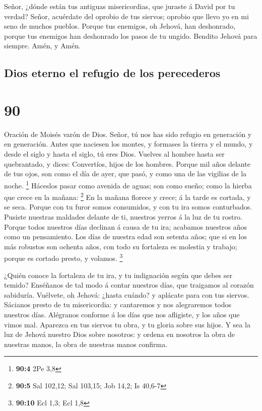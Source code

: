  Señor, ¿dónde están tus antiguas misericordias, que
juraste á David por tu verdad?  Señor, acuérdate del
oprobio de tus siervos; oprobio que llevo yo en mi seno de muchos
pueblos.  Porque tus enemigos, oh Jehová, han deshonrado,
porque tus enemigos han deshonrado los pasos de tu ungido. 
Bendito Jehová para siempre. Amén, y Amén.

\hypertarget{dios-eterno-el-refugio-de-los-perecederos}{%
\subsection{Dios eterno el refugio de los
perecederos}\label{dios-eterno-el-refugio-de-los-perecederos}}

\hypertarget{section-89}{%
\section{90}\label{section-89}}

 Oración de Moisés varón de Dios. Señor, tú nos has sido
refugio en generación y en generación.  Antes que naciesen
los montes, y formases la tierra y el mundo, y desde el siglo y hasta el
siglo, tú eres Dios.  Vuelves al hombre hasta ser
quebrantado, y dices: Convertíos, hijos de los hombres. 
Porque mil años delante de tus ojos, son como el día de ayer, que pasó,
y como una de las vigilias de la noche. \footnote{\textbf{90:4} 2Pe 3,8}
 Háceslos pasar como avenida de aguas; son como sueño; como
la hierba que crece en la mañana: \footnote{\textbf{90:5} Sal 102,12;
  Sal 103,15; Job 14,2; Is 40,6-7}  En la mañana florece y
crece; á la tarde es cortada, y se seca.  Porque con tu
furor somos consumidos, y con tu ira somos conturbados. 
Pusiste nuestras maldades delante de ti, nuestros yerros á la luz de tu
rostro.  Porque todos nuestros días declinan á causa de tu
ira; acabamos nuestros años como un pensamiento.  Los días
de nuestra edad son setenta años; que si en los más robustos son ochenta
años, con todo su fortaleza es molestia y trabajo; porque es cortado
presto, y volamos. \footnote{\textbf{90:10} Ecl 1,3; Ecl 1,8}

 ¿Quién conoce la fortaleza de tu ira, y tu indignación
según que debes ser temido?  Enséñanos de tal modo á contar
nuestros días, que traigamos al corazón sabiduría. 
Vuélvete, oh Jehová: ¿hasta cuándo? y aplácate para con tus siervos.
 Sácianos presto de tu misericordia: y cantaremos y nos
alegraremos todos nuestros días.  Alégranos conforme á los
días que nos afligiste, y los años que vimos mal.  Aparezca
en tus siervos tu obra, y tu gloria sobre sus hijos.  Y sea
la luz de Jehová nuestro Dios sobre nosotros: y ordena en nosotros la
obra de nuestras manos, la obra de nuestras manos confirma.

